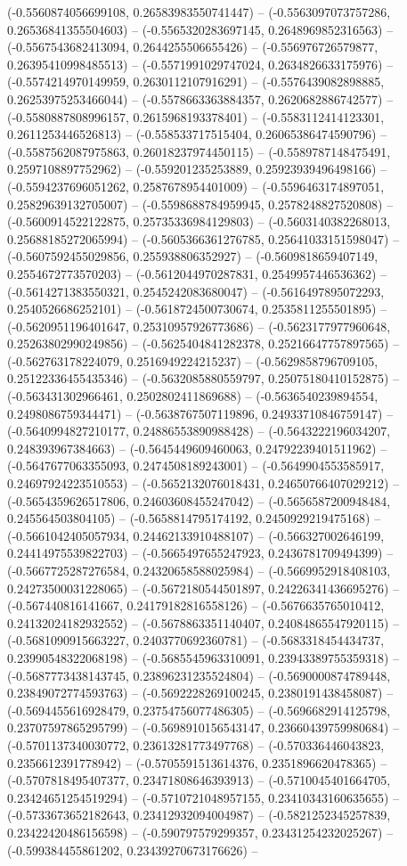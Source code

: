 (-0.5560874056699108, 0.26583983550741447) -- (-0.5563097073757286, 0.26536841355504603) -- (-0.5565320283697145, 0.2648969852316563) -- (-0.5567543682413094, 0.2644255506655426) -- (-0.556976726579877, 0.26395410998485513) -- (-0.5571991029747024, 0.2634826633175976) -- (-0.5574214970149959, 0.2630112107916291) -- (-0.5576439082898885, 0.26253975253466044) -- (-0.5578663363884357, 0.2620682886742577) -- (-0.5580887808996157, 0.2615968193378401) -- (-0.5583112414123301, 0.2611253446526813) -- (-0.558533717515404, 0.26065386474590796) -- (-0.5587562087975863, 0.26018237974450115) -- (-0.5589787148475491, 0.2597108897752962) -- (-0.559201235253889, 0.25923939496498166) -- (-0.5594237696051262, 0.2587678954401009) -- (-0.5596463174897051, 0.25829639132705007) -- (-0.5598688784959945, 0.2578248827520808) -- (-0.5600914522122875, 0.25735336984129803) -- (-0.5603140382268013, 0.25688185272065994) -- (-0.5605366361276785, 0.25641033151598047) -- (-0.5607592455029856, 0.255938806352927) -- (-0.5609818659407149, 0.2554672773570203) -- (-0.5612044970287831, 0.2549957446536362) -- (-0.5614271383550321, 0.2545242083680047) -- (-0.5616497895072293, 0.2540526686252101) -- (-0.5618724500730674, 0.2535811255501895) -- (-0.5620951196401647, 0.25310957926773686) -- (-0.5623177977960648, 0.25263802990249856) -- (-0.5625404841282378, 0.25216647757897565) -- (-0.562763178224079, 0.2516949224215237) -- (-0.5629858796709105, 0.25122336455435346) -- (-0.5632085880559797, 0.25075180410152875) -- (-0.563431302966461, 0.2502802411869688) -- (-0.5636540239894554, 0.2498086759344471) -- (-0.5638767507119896, 0.24933710846759147) -- (-0.5640994827210177, 0.24886553890988428) -- (-0.5643222196034207, 0.248393967384663) -- (-0.5645449609460063, 0.24792239401511962) -- (-0.5647677063355093, 0.2474508189243001) -- (-0.5649904553585917, 0.24697924223510553) -- (-0.5652132076018431, 0.24650766407029212) -- (-0.5654359626517806, 0.24603608455247042) -- (-0.5656587200948484, 0.245564503804105) -- (-0.5658814795174192, 0.2450929219475168) -- (-0.5661042405057934, 0.24462133910488107) -- (-0.566327002646199, 0.24414975539822703) -- (-0.5665497655247923, 0.2436781709494399) -- (-0.5667725287276584, 0.24320658588025984) -- (-0.5669952918408103, 0.24273500031228065) -- (-0.5672180544501897, 0.24226341436695276) -- (-0.567440816141667, 0.24179182816558126) -- (-0.5676635765010412, 0.24132024182932552) -- (-0.5678863351140407, 0.24084865547920115) -- (-0.5681090915663227, 0.2403770692360781) -- (-0.5683318454434737, 0.23990548322068198) -- (-0.5685545963310091, 0.23943389755359318) -- (-0.5687773438143745, 0.23896231235524804) -- (-0.5690000874789448, 0.23849072774593763) -- (-0.5692228269100245, 0.2380191438458087) -- (-0.5694455616928479, 0.23754756077486305) -- (-0.5696682914125798, 0.23707597865295799) -- (-0.5698910156543147, 0.23660439759980684) -- (-0.5701137340030772, 0.23613281773497768) -- (-0.570336446043823, 0.2356612391778942) -- (-0.5705591513614376, 0.2351896620478365) -- (-0.5707818495407377, 0.23471808646393913) -- (-0.5710045401664705, 0.23424651254519294) -- (-0.5710721048957155, 0.23410343160635655) -- (-0.5733673652182643, 0.23412932094004987) -- (-0.5821252345257839, 0.23422420486156598) -- (-0.590797579299357, 0.23431254232025267) -- (-0.599384455861202, 0.23439270673176626) -- 
